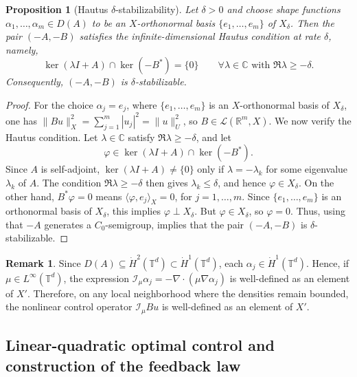 \documentclass[11pt]{article}
\numberwithin{equation}{section}
\newtheorem{proposition}[theorem]{Proposition}
\theoremstyle{definition}
\newtheorem{remark}[theorem]{Remark}
\newcommand{\R}{\mathbb{R}}
\newcommand{\T}{\mathbb{T}}
\newcommand{\rieszmap}[1][\mu]{\mathcal{I}_{#1}}
\newcommand{\dotHk}[1][k]{\dot{H}^{#1}}
\begin{document}
\begin{proposition}[Hautus $\delta$-stabilizability]
    \label{prop:hautus}
    Let $\delta > 0$ and choose shape functions $\alpha_1, \dots, \alpha_m \in D(A)$ to be an $X$-orthonormal basis $\{e_1,\dots,e_m\}$ of $X_\delta$.
    Then the pair $(-A,-B)$ satisfies the infinite-dimensional Hautus condition at rate $\delta$, namely,
    \[
    \ker(\lambda I+A) \cap \ker (-B^*) = \{0\} \qquad \forall \lambda \in \mathbb{C} \text{ with }\Re\lambda\ge -\delta.
    \]
    Consequently, $(-A,-B)$ is $\delta$-stabilizable.
\end{proposition}

\begin{proof}
    For the choice $\alpha_j = e_j$, where $\{e_1,\dots,e_m\}$ is an $X$-orthonormal basis of $X_\delta$, one has $\|Bu\|_X^2 = \sum_{j=1}^m |u_j|^2 = \|u\|_U^2$, so $B \in \mathcal{L}(\R^m, X)$.
    We now verify the Hautus condition. 
    Let $\lambda \in \mathbb{C}$ satisfy $\Re\lambda\ge -\delta$, and let
    \[
    \varphi \in \ker(\lambda I+A) \cap \ker (-B^*).
    \]
    Since $A$ is self-adjoint, $\ker(\lambda I + A) \neq \{0\}$ only if $\lambda = -\lambda_k$ for some eigenvalue $\lambda_k$ of $A$. 
    The condition $\Re\lambda\ge -\delta$ then gives $\lambda_k \le \delta$, and hence $\varphi \in X_\delta$. 
    On the other hand, $B^*\varphi = 0$ means $\langle \varphi, e_j\rangle_X = 0$, for $j=1,\dots,m$.
    Since $\{e_1, \dots, e_m\}$ is an orthonormal basis of $X_\delta$, this implies $\varphi \perp X_\delta$. 
    But $\varphi \in X_\delta$, so $\varphi = 0$.
    Thus, using that $-A$ generates a $C_0$-semigroup, \cite[Thm.~5.2.11]{CurtainZwart1995} implies that the pair $(-A, -B)$ is $\delta$-stabilizable.
\end{proof}

\begin{remark}
    Since $D(A) \subseteq \dotHk[2](\T^d) \subset \dotHk[1](\T^d)$, each $\alpha_j \in \dotHk[1](\T^d)$. 
    Hence, if $\mu \in L^\infty(\T^d)$, the expression $\rieszmap[\mu]\alpha_j = -\nabla \cdot (\mu \nabla \alpha_j)$ is well-defined as an element of $X'$.
    Therefore, on any local neighborhood where the densities remain bounded, the nonlinear control operator $\rieszmap[\mu] B u$ is well-defined as an element of $X'$.
\end{remark}

\subsection{Linear-quadratic optimal control and construction of the feedback law}
\label{sec:feedback_law}
\end{document}
